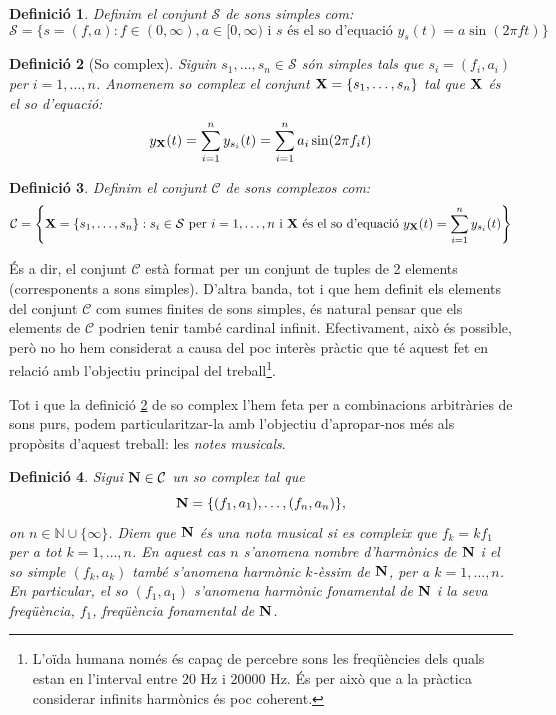 \documentclass{article}
\theoremstyle{math}
\newtheorem{definition}{Definició}[section]
\theoremstyle{TheoremNum}
\newcommand{\0}{\ensuremath{\vb{0}}}
\newcommand{\N}{\ensuremath{\vb{N}}}
\newcommand{\X}{\ensuremath{\vb{X}}}
\newcommand{\NN}{\ensuremath{\mathbb{N}}} %
\newcommand\Hz{\text{ Hz}}
\begin{document}
\begin{definition}
    Definim el conjunt $\mathcal{S}$ de sons simples com: $$\mathcal{S}=\{s=(f,a):f\in(0,\infty),a\in[0,\infty)\text{ i $s$ és el so d'equació }y_s(t)=a\sin(2\pi ft)\}$$
\end{definition}
\begin{definition}[So complex]\label{so_complex}
Siguin $s_1,\ldots,s_n\in\mathcal{S}$ són simples tals que $s_i=(f_i,a_i)$ per $i=1,\ldots,n$. Anomenem \textit{so complex} el conjunt $\X=\{s_1,\ldots,s_n\}$ tal que $\X$ és el so d'equació: $$y_{\X}(t)=\sum_{i=1}^ny_{s_i}(t)=\sum_{i=1}^na_i\sin(2\pi f_it)$$
\end{definition}
\begin{definition}
    Definim el conjunt $\mathcal{C}$ de sons complexos com:
    $$\mathcal{C}=\left\{\X=\{s_1,\ldots,s_n\}:s_i\in\mathcal{S}\text{ per } i=1,\ldots,n\text{ i $\X$ és el so d'equació }y_{\X}(t)=\sum_{i=1}^ny_{s_i}(t)\right\}$$
\end{definition}
\noindent És a dir, el conjunt $\mathcal{C}$ està format per un conjunt de tuples de 2 elements (corresponents a sons simples). D'altra banda, tot i que hem definit els elements del conjunt $\mathcal{C}$ com sumes finites de sons simples, és natural pensar que els elements de $\mathcal{C}$ podrien tenir també cardinal infinit. Efectivament, això és possible, però no ho hem considerat a causa del poc interès pràctic que té aquest fet en relació amb l'objectiu principal del treball\footnote{L'oïda humana només és capaç de percebre sons les freqüències dels quals estan en l'interval entre $20\Hz$ i $20000\Hz$. És per això que a la pràctica considerar infinits harmònics és poc coherent.}.\par
Tot i que la definició \ref{so_complex} de so complex l'hem feta per a combinacions arbitràries de sons purs, podem  particularitzar-la amb l'objectiu d'apropar-nos més als propòsits d'aquest treball: les \textit{notes musicals}.
\begin{definition}
    Sigui $\N\in\mathcal{C}$ un so complex tal que $$\N=\{(f_1,a_1),\ldots,(f_n,a_n)\},$$ on $n\in\NN\cup\{\infty\}$. Diem que $\N$ és una \textit{nota musical} si es compleix que $f_k=kf_1$ per a tot $k=1,\ldots,n$. En aquest cas $n$ s'anomena \textit{nombre d'harmònics de $\N$} i el so simple $(f_k,a_k)$ també s'anomena \textit{harmònic $k$-èssim de $\N$}, per a $k=1,\ldots,n$. En particular, el so $(f_1,a_1)$ s'anomena \textit{harmònic fonamental de $\N$} i la seva freqüència, $f_1$, \textit{freqüència fonamental de $\N$}.
\end{definition}
\end{document}
